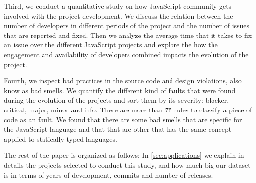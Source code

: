 Third, we conduct a quantitative study on how JavaScript community gets involved with the project development. We discuss the relation between the number of developers in different periods of the project and the number of issues that are reported and fixed. Then we analyze the average time that it takes to fix an issue over the different JavaScript projects and explore the how the engagement and availability of developers combined impacts the evolution of the project. 

Fourth, we inspect bad practices in the source code and design violations, also know as bad smells. We quantify the different kind of faults that were found during the evolution of the projects and sort them by its severity: blocker, critical, major, minor and info. There are more than 75 rules to classify a piece of code as an fault. We found that there are some bad smells that are specific for the JavaScript language and that that are other that has the same concept applied to statically typed languages.

The rest of the paper is organized as follows: In \ref{sec:applications} we explain in details the projects selected to conduct this study, and how much big our dataset is in terms of years of development, commits and number of releases. 